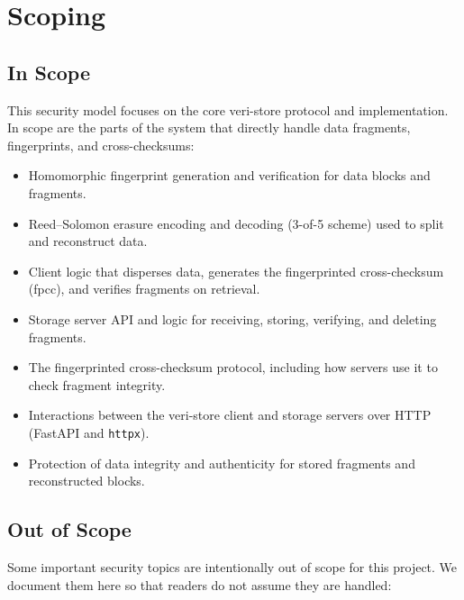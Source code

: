 \documentclass[../veristore_security_model.tex]{subfiles}
\begin{document}
\section{Scoping}
\subsection{In Scope}

This security model focuses on the core veri-store protocol and implementation. In scope are the parts of the system that directly handle data fragments, fingerprints, and cross-checksums:

\begin{itemize}
    \item Homomorphic fingerprint generation and verification for data blocks and fragments.
    \item Reed--Solomon erasure encoding and decoding (3-of-5 scheme) used to split and reconstruct data.
    \item Client logic that disperses data, generates the fingerprinted cross-checksum (fpcc), and verifies fragments on retrieval.
    \item Storage server API and logic for receiving, storing, verifying, and deleting fragments.
    \item The fingerprinted cross-checksum protocol, including how servers use it to check fragment integrity.
    \item Interactions between the veri-store client and storage servers over HTTP (FastAPI and \texttt{httpx}).
    \item Protection of data integrity and authenticity for stored fragments and reconstructed blocks.
\end{itemize}

\subsection{Out of Scope}

Some important security topics are intentionally out of scope for this project. We document them here so that readers do not assume they are handled:
\end{document}

